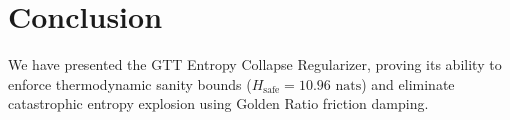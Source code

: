 \section{Conclusion}
We have presented the GTT Entropy Collapse Regularizer, proving its ability to enforce thermodynamic sanity bounds ($H_{\text{safe}} = 10.96\text{ nats}$) and eliminate catastrophic entropy explosion using Golden Ratio friction damping.